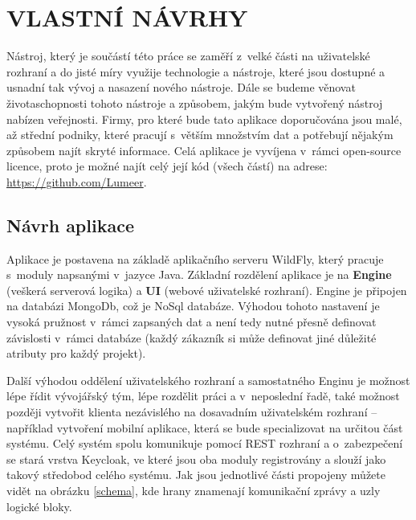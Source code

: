 \chapter{VLASTNÍ NÁVRHY}
\par Nástroj, který je součástí této práce se zaměří z~velké části na uživatelské rozhraní a do jisté míry využije technologie a nástroje, které jsou dostupné a usnadní tak vývoj a nasazení nového nástroje. Dále se budeme věnovat  životaschopnosti tohoto nástroje a způsobem, jakým bude vytvořený nástroj nabízen veřejnosti. Firmy, pro které bude tato aplikace doporučována jsou malé, až střední podniky, které pracují s~větším množstvím dat a potřebují nějakým způsobem najít skryté informace. Celá aplikace je vyvíjena v~rámci open-source licence, proto je možné najít celý její kód (všech částí) na adrese: \url{https://github.com/Lumeer}.

\section{Návrh aplikace}
\par Aplikace je postavena na základě aplikačního serveru WildFly, který pracuje s~moduly napsanými v~jazyce Java. Základní rozdělení aplikace je na \textbf{Engine} (veškerá serverová logika) a \textbf{UI} (webové uživatelské rozhraní). Engine je připojen na databázi MongoDb, což je NoSql databáze. Výhodou tohoto nastavení je vysoká pružnost v~rámci zapsaných dat a není tedy nutné přesně definovat závislosti v~rámci databáze (každý zákazník si může definovat jiné důležité atributy pro každý projekt).

\par Další výhodou oddělení uživatelského rozhraní a samostatného Enginu je možnost lépe řídit vývojářský tým, lépe rozdělit práci a v~neposlední řadě, také možnost později vytvořit klienta nezávislého na dosavadním uživatelském rozhraní -- například vytvoření mobilní aplikace, která se bude specializovat na určitou část systému. Celý systém spolu komunikuje pomocí REST rozhraní a o~zabezpečení se stará vrstva Keycloak, ve které jsou oba moduly registrovány a slouží jako takový středobod celého systému. Jak jsou jednotlivé části propojeny můžete vidět na obrázku \ref{schema}, kde hrany znamenají komunikační zprávy a uzly logické bloky.

